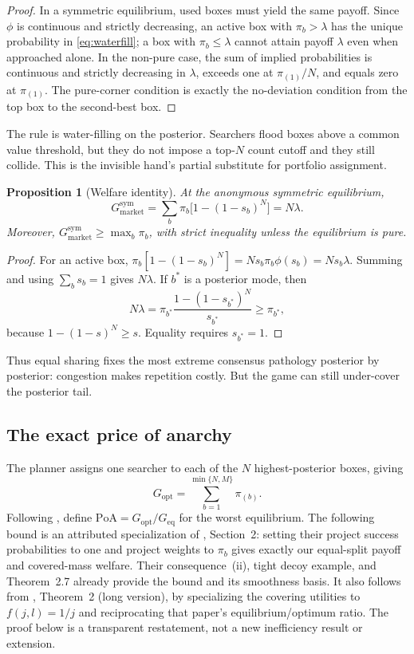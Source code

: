\documentclass[11pt]{article}
\newtheorem{proposition}{Proposition}
\theoremstyle{definition}
\theoremstyle{remark}
\newcommand{\1}{\mathbf{1}}
\newcommand{\opt}{\mathrm{opt}}
\newcommand{\mkt}{\mathrm{market}}
\newcommand{\PoA}{\mathrm{PoA}}
\begin{document}
\begin{proof}
In a symmetric equilibrium, used boxes must yield the same payoff. Since $\phi$ is continuous and strictly decreasing, an active box with $\pi_b>\lambda$ has the unique probability in \cref{eq:waterfill}; a box with $\pi_b\le\lambda$ cannot attain payoff $\lambda$ even when approached alone. In the non-pure case, the sum of implied probabilities is continuous and strictly decreasing in $\lambda$, exceeds one at $\pi_{(1)}/N$, and equals zero at $\pi_{(1)}$. The pure-corner condition is exactly the no-deviation condition from the top box to the second-best box.
\end{proof}

The rule is water-filling on the posterior. Searchers flood boxes above a common value threshold, but they do not impose a top-$N$ count cutoff and they still collide. This is the invisible hand's partial substitute for portfolio assignment.

\begin{proposition}[Welfare identity]
\label{prop:welfare}
At the anonymous symmetric equilibrium,
\begin{equation}
G_{\mkt}^{\mathrm{sym}}
=\sum_b\pi_b\bigl[1-(1-s_b)^N\bigr]
=N\lambda.
\label{eq:welfare-identity}
\end{equation}
Moreover, $G_{\mkt}^{\mathrm{sym}}\ge\max_b\pi_b$, with strict inequality unless the equilibrium is pure.
\end{proposition}

\begin{proof}
For an active box, $\pi_b[1-(1-s_b)^N]=N s_b\pi_b\phi(s_b)=Ns_b\lambda$. Summing and using $\sum_bs_b=1$ gives $N\lambda$. If $b^*$ is a posterior mode, then
\[
N\lambda=\pi_{b^*}\frac{1-(1-s_{b^*})^N}{s_{b^*}}\ge\pi_{b^*},
\]
because $1-(1-s)^N\ge s$. Equality requires $s_{b^*}=1$.
\end{proof}

Thus equal sharing fixes the most extreme consensus pathology posterior by posterior: congestion makes repetition costly. But the game can still under-cover the posterior tail.

\subsection{The exact price of anarchy}

The planner assigns one searcher to each of the $N$ highest-posterior boxes, giving
\[
G_{\opt}=\sum_{b=1}^{\min\{N,M\}}\pi_{(b)}.
\]
Following \citet{KoutsoupiasPapadimitriou1999}, define $\PoA=G_{\opt}/G_{\mathrm{eq}}$ for the worst equilibrium. The following bound is an attributed specialization of \citet{KleinbergOren2011}, Section~2: setting their project success probabilities to one and project weights to $\pi_b$ gives exactly our equal-split payoff and covered-mass welfare. Their consequence~(ii), tight decoy example, and Theorem~2.7 already provide the bound and its smoothness basis. It also follows from \citet{Gairing2009}, Theorem~2 (long version), by specializing the covering utilities to $f(j,l)=1/j$ and reciprocating that paper's equilibrium/optimum ratio. The proof below is a transparent restatement, not a new inefficiency result or extension.
\end{document}
